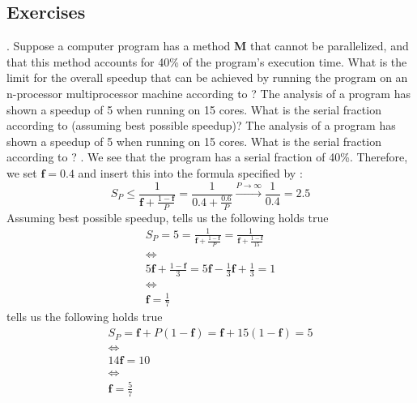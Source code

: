 \documentclass[main.tex]{subfiles}
\begin{document}
\pagebreak

\subsection{Exercises}

\begin{ExerciseList}
    \Exercise[title={Amdahl's Law, Gustafson's Law, Performance},label=AGL].
        \Question Suppose a computer program has a method \textbf{M} that cannot be parallelized, and that this method accounts for 40\% of the program’s execution time. What is the limit for the overall speedup that can be achieved by running the program on an n-processor multiprocessor machine according to ?
        \Question The analysis of a program has shown a speedup of 5 when running on 15 cores. What is the serial fraction according to  (assuming best possible speedup)?
        \Question The analysis of a program has shown a speedup of 5 when running on 15 cores. What is the serial fraction according to ?
    \Answer[ref={AGL}].
        \Question We see that the program has a serial fraction of 40\%. Therefore, we set $\mathbf{f} = 0.4$ and insert this into the formula specified by :
            \begin{equation*}
                S_P \leq \frac{1}{\mathbf{f} + \frac{1-\mathbf{f}}{P}} = \frac{1}{0.4 + \frac{0.6}{P}} \xrightarrow{P \rightarrow \infty} \frac{1}{0.4} = 2.5
            \end{equation*}
        \Question Assuming best possible speedup,  tells us the following holds true
            \begin{gather*}
                S_P = 5 = \frac{1}{\mathbf{f}+\frac{1-\mathbf{f}}{P}} = \frac{1}{\mathbf{f}+\frac{1-\mathbf{f}}{15}} \\
                \Longleftrightarrow\\
                5 \mathbf{f} + \frac{1-\mathbf{f}}{3} = 5 \mathbf{f} - \frac{1}{3} \mathbf{f} + \frac{1}{3} = 1\\
                \Longleftrightarrow\\
                \mathbf{f} = \frac{1}{7}
            \end{gather*}
        \Question {} tells us the following holds true
            \begin{gather*}
                S_P = \mathbf{f} + P (1 - \mathbf{f})
                    = \mathbf{f} + 15 (1 - \mathbf{f})
                    = 5 \\
                \Longleftrightarrow\\
                14 \mathbf{f} = 10\\
                \Longleftrightarrow\\
                \mathbf{f} = \frac{5}{7}
            \end{gather*}
        

\end{ExerciseList}
\end{document}
